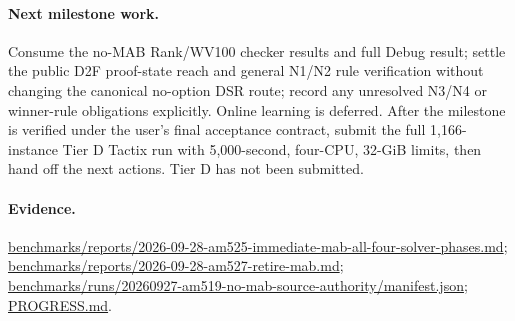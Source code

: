 \documentclass[11pt]{article}
\begin{document}
\paragraph{Next milestone work.}
Consume the no-MAB Rank/WV100 checker results and full Debug result; settle the public D2F proof-state reach and general N1/N2 rule verification without changing the canonical no-option DSR route; record any unresolved N3/N4 or winner-rule obligations explicitly. Online learning is deferred. After the milestone is verified under the user's final acceptance contract, submit the full 1,166-instance Tier D Tactix run with 5,000-second, four-CPU, 32-GiB limits, then hand off the next actions. Tier D has not been submitted.

\paragraph{Evidence.}
\url{benchmarks/reports/2026-09-28-am525-immediate-mab-all-four-solver-phases.md};
\url{benchmarks/reports/2026-09-28-am527-retire-mab.md};
\url{benchmarks/runs/20260927-am519-no-mab-source-authority/manifest.json};
\url{PROGRESS.md}.
\end{document}
